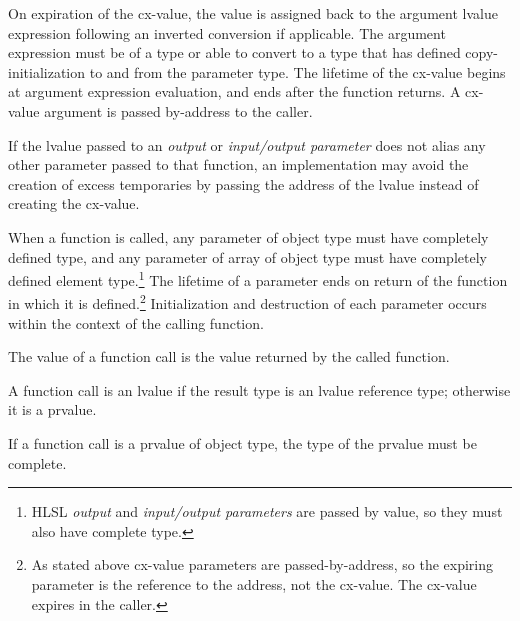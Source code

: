 \p On expiration of the cx-value, the value is assigned back to the argument
lvalue expression following an inverted conversion if applicable. The argument
expression must be of a type or able to convert to a type that has defined
copy-initialization to and from the parameter type. The lifetime of the cx-value
begins at argument expression evaluation, and ends after the function returns. A
cx-value argument is passed by-address to the caller.

\p If the lvalue passed to an \textit{output} or \textit{input/output parameter}
does not alias any other parameter passed to that function, an implementation
may avoid the creation of excess temporaries by passing the address of the
lvalue instead of creating the cx-value.

\p When a function is called, any parameter of object type must have completely
defined type, and any parameter of array of object type must have completely
defined element type.\footnote{HLSL \textit{output} and \textit{input/output
parameters} are passed by value, so they must also have complete type.} The
lifetime of a parameter ends on return of the function in which it is
defined.\footnote{As stated above cx-value parameters are passed-by-address, so
the expiring parameter is the reference to the address, not the cx-value. The
cx-value expires in the caller.} Initialization and destruction of each
parameter occurs within the context of the calling function.

\p The value of a function call is the value returned by the called function.

\p A function call is an lvalue if the result type is an lvalue reference type;
otherwise it is a prvalue.

\p If a function call is a prvalue of object type, the type of the prvalue must
be complete.
